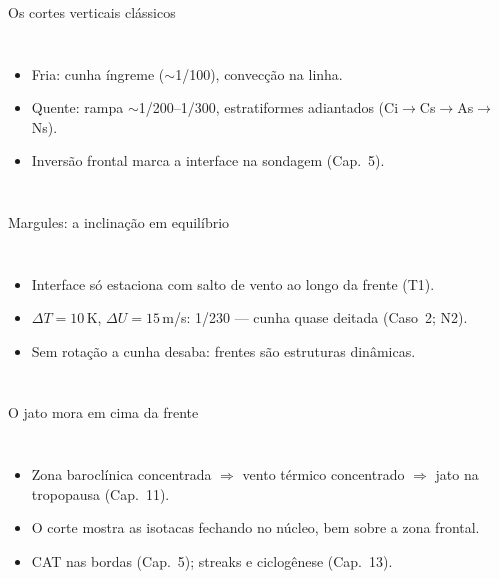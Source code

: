 \documentclass[aspectratio=169,11pt]{beamer}
\begin{document}
\begin{frame}{Os cortes verticais clássicos}
  \begin{columns}
    \begin{itemize}
      \item Fria: cunha íngreme ($\sim$1/100), convecção na linha.
      \item Quente: rampa $\sim$1/200--1/300, estratiformes
            adiantados (Ci$\to$Cs$\to$As$\to$Ns).
      \item Inversão frontal marca a interface na sondagem (Cap.~5).
    \end{itemize}
  \end{columns}
\end{frame}

\begin{frame}{Margules: a inclinação em equilíbrio}
  \begin{columns}
    \vspace{0.4em}
    \begin{itemize}
      \item Interface só estaciona com salto de vento ao longo da
            frente (T1).
      \item $\Delta T = 10$\,K, $\Delta U = 15$\,m/s: 1/230 — cunha
            quase deitada (Caso~2; N2).
      \item Sem rotação a cunha desaba: frentes são estruturas
            dinâmicas.
    \end{itemize}
  \end{columns}
\end{frame}

\begin{frame}{O jato mora em cima da frente}
  \begin{columns}
    \begin{itemize}
      \item Zona baroclínica concentrada $\Rightarrow$ vento térmico
            concentrado $\Rightarrow$ \alert{jato} na tropopausa
            (Cap.~11).
      \item O corte mostra as isotacas fechando no núcleo, bem sobre a
            zona frontal.
      \item CAT nas bordas (Cap.~5); streaks e ciclogênese (Cap.~13).
    \end{itemize}
  \end{columns}
\end{frame}
\end{document}
